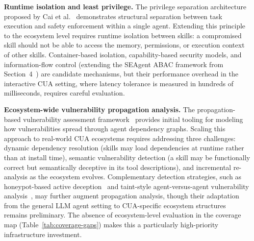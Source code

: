 \smallskip
\noindent\textbf{Runtime isolation and least privilege.}
The privilege separation architecture proposed by Cai et al.~\cite{agentprivsep2026} demonstrates structural separation between task execution and safety enforcement within a single agent. Extending this principle to the ecosystem level requires runtime isolation between skills: a compromised skill should not be able to access the memory, permissions, or execution context of other skills. Container-based isolation, capability-based security models, and information-flow control (extending the SEAgent ABAC framework from Section~4~\cite{seagent2026}) are candidate mechanisms, but their performance overhead in the interactive CUA setting, where latency tolerance is measured in hundreds of milliseconds, requires careful evaluation.

\smallskip
\noindent\textbf{Ecosystem-wide vulnerability propagation analysis.}
The propagation-based vulnerability assessment framework~\cite{propagvuln2025} provides initial tooling for modeling how vulnerabilities spread through agent dependency graphs. Scaling this approach to real-world CUA ecosystems requires addressing three challenges: dynamic dependency resolution (skills may load dependencies at runtime rather than at install time), semantic vulnerability detection (a skill may be functionally correct but semantically deceptive in its tool descriptions), and incremental re-analysis as the ecosystem evolves. Complementary detection strategies, such as honeypot-based active deception~\cite{cloakhoneytrap2025} and taint-style agent-versus-agent vulnerability analysis~\cite{makeagentdefeatagent2025}, may further augment propagation analysis, though their adaptation from the general LLM agent setting to CUA-specific ecosystem structures remains preliminary. The absence of ecosystem-level evaluation in the coverage map (Table~\ref{tab:coverage-gaps}) makes this a particularly high-priority infrastructure investment.


